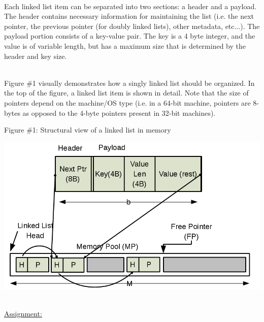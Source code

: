\documentclass[12pt]{extarticle}
\newenvironment{myindentpar}[1]%
 {\begin{list}{}%
         {\setlength{\leftmargin}{#1}}%
         \item[]%
 }
 {\end{list}}
\begin{document}
\begin{myindentpar}{6.5mm}
\ \\
Each linked list item can be separated into two sections: a header and a payload.  The header contains necessary information for maintaining the list (i.e. the next pointer, the previous pointer (for doubly linked lists), other metadata, etc...). The payload portion consists of a key-value pair.  The key is a 4 byte integer, and the value is of variable length, but has a maximum size that is determined by the header and key size.  

\ \\
Figure \#1 visually demonstrates how a singly linked list should be organized.  In the top of the figure, a linked list item is shown in detail.  Note that the size of pointers depend on the machine/OS type (i.e. in a 64-bit machine, pointers are 8-bytes as opposed to the 4-byte pointers present in 32-bit machines).  

\end{myindentpar}

\begin{center}
    Figure \#1: Structural view of a linked list in memory
\end{center}
\begin{center}
    \includegraphics[scale=0.6]{ll_overview.png}
\end{center}

\ \\
{\large \underline{Assignment:}}
\end{document}
